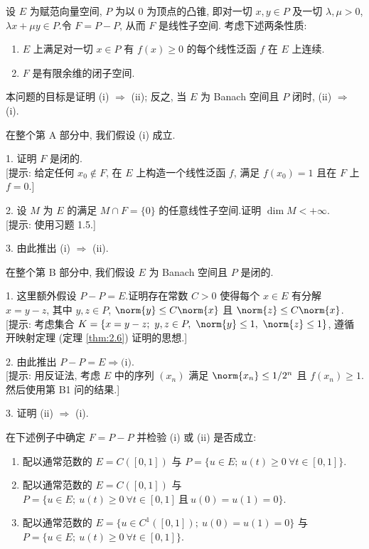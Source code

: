 \begin{problem}[第 1, 2 章]
\label{prob:5}
设 $E$ 为赋范向量空间, $P$ 为以 $0$ 为顶点的凸锥, 即对一切 $x,y\in P$ 及一切
$\lambda,\mu>0$, $\lambda x+\mu y\in P$.令 $F=P-P$, 从而 $F$ 是线性子空间.
考虑下述两条性质:
\begin{enumerate}[label=(\roman*), itemsep=0.1em]
	\item $E$ 上满足对一切 $x\in P$ 有 $f(x)\ge0$ 的每个线性泛函 $f$ 在 $E$ 上连续.
	\item $F$ 是有限余维的闭子空间.
\end{enumerate}
本问题的目标是证明 (i) $\Rightarrow$ (ii); 反之, 当 $E$ 为 Banach 空间且 $P$
闭时, (ii) $\Rightarrow$ (i).


在整个第 A 部分中, 我们假设 (i) 成立.

1. 证明 $F$ 是闭的.\\
{[提示: 给定任何 $x_0\notin F$, 在 $E$ 上构造一个线性泛函 $f$, 满足 $f(x_0)=1$
且在 $F$ 上 $f=0$.]}

2. 设 $M$ 为 $E$ 的满足 $M\cap F=\{0\}$ 的任意线性子空间.证明 $\dim M<+\infty$.\\
{[提示: 使用习题 1.5.]}

3. 由此推出 (i) $\Rightarrow$ (ii).


在整个第 B 部分中, 我们假设 $E$ 为 Banach 空间且 $P$ 是闭的.

1. 这里额外假设 $P-P=E$.证明存在常数 $C>0$ 使得每个 $x\in E$ 有分解
$x=y-z$, 其中 $y,z\in P$, $\norm{y}\le C\norm{x}$ 且 $\norm{z}\le C\norm{x}$.\\
{[提示: 考虑集合 $K=\{x=y-z;\ y,z\in P,\ \norm{y}\le1,\ \norm{z}\le1\}$, 遵循
开映射定理 (定理  \ref{thm:2.6}) 证明的思想.]}

2. 由此推出 $P-P=E\Rightarrow\text{(i)}$.\\
{[提示: 用反证法, 考虑 $E$ 中的序列 $(x_n)$ 满足 $\norm{x_n}\le1/2^n$ 且
$f(x_n)\ge1$.然后使用第 B1 问的结果.]}

3. 证明 (ii) $\Rightarrow$ (i).


在下述例子中确定 $F=P-P$ 并检验 (i) 或 (ii) 是否成立:
\begin{enumerate}[label=(\alph*), itemsep=0.1em]
	\item 配以通常范数的 $E=C([0,1])$ 与 $P=\{u\in E;\ u(t)\ge0\ \forall t\in[0,1]\}$.
	\item 配以通常范数的 $E=C([0,1])$ 与 $P=\{u\in E;\ u(t)\ge0\ \forall t\in[0,1]\ \text{且}\ u(0)=u(1)=0\}$.
	\item 配以通常范数的 $E=\{u\in C^1([0,1]);\ u(0)=u(1)=0\}$ 与 $P=\{u\in E;\ u(t)\ge0\ \forall t\in[0,1]\}$.
\end{enumerate}
\end{problem}

